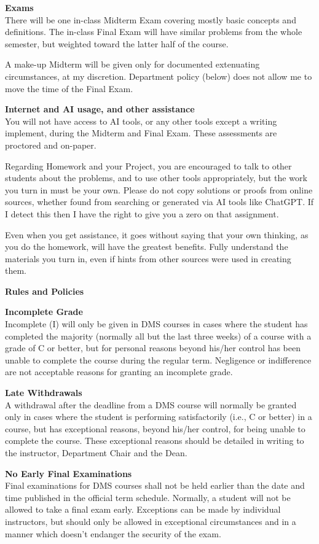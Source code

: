 \documentclass[12pt]{article}
\renewcommand{\emph}[1]{\textsf{\textbf{#1}}}
\newcommand{\localhead}[1]{\par\smallskip\textbf{#1} \smallskip\nobreak\\}%
\def\heading#1{\localhead{\large\emph{#1}}}
\def\subheading#1{\localhead{\emph{#1}}}
\begin{document}
\heading{Exams}
There will be one in-class Midterm Exam covering mostly basic concepts and definitions. The in-class Final Exam will have similar problems from the whole semester, but weighted toward the latter half of the course.

A make-up Midterm will be given only for documented extenuating circumstances, at my discretion.  Department policy (below) does not allow me to move the time of the Final Exam.

\heading{Internet and AI usage, and other assistance}
You will not have access to AI tools, or any other tools except a writing implement, during the Midterm and Final Exam.  These assessments are proctored and on-paper.

Regarding Homework and your Project, you are encouraged to talk to other students about the problems, and to use other tools appropriately, but the work you turn in must be your own.  Please do not copy solutions or proofs from online sources, whether found from searching or generated via AI tools like ChatGPT.   If I detect this then I have the right to give you a zero on that assignment.

Even when you get assistance, it goes without saying that your own thinking, as you do the homework, will have the greatest benefits.  Fully understand the materials you turn in, even if hints from other sources were used in creating them.

\heading{Rules and Policies}
\vskip -20pt

\subheading{Incomplete Grade} 
Incomplete (I) will only be given in
  DMS courses in cases where
  the student has completed the majority (normally all but the last
  three weeks) of a course with a grade of C or better, but for
  personal reasons beyond his/her control has been unable to complete
  the course during the regular term. Negligence or indifference are
  not acceptable reasons for granting an incomplete grade.

\subheading{Late Withdrawals} 
A withdrawal after the deadline from a DMS course will
  normally be granted only in cases where the student is performing
  satisfactorily (i.e., C or better) in a course, but has exceptional
  reasons, beyond his/her control, for being unable to complete the
  course.  These exceptional reasons should be detailed in writing to
  the instructor, Department Chair and the Dean.

\subheading{No Early Final Examinations}
Final examinations for DMS courses shall not be held earlier than the date and time published in the official term schedule.  Normally, a student will not be allowed to take a final exam early.  Exceptions can be made by individual instructors, but should only be allowed in exceptional circumstances and in a manner which doesn't endanger the security of the exam.
\end{document}
